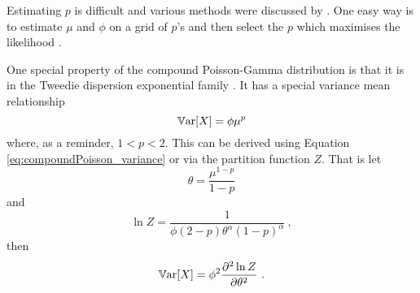 Estimating $p$ is difficult and various methods were discussed by \cite{zhang2013likelihood}. One easy way is to estimate $\mu$ and $\phi$ on a grid of $p$'s and then select the $p$ which maximises the likelihood \citep{dunn2005series}.

One special property of the compound Poisson-Gamma distribution is that it is in the Tweedie dispersion exponential family \citep{jorgensen1987exponential}. It has a special variance mean relationship
\begin{equation}
	\operatorname{\mathbb{V}ar}[X] = \phi \mu^p
\end{equation}
where, as a reminder, $1<p<2$. This can be derived using Equation \eqref{eq:compoundPoisson_variance} or via the partition function $Z$. That is let
\begin{equation}
	\theta = \frac{\mu^{1-p}}{1-p}
\end{equation}
and
\begin{equation}
	\ln Z = \frac{1}{\phi(2-p)\theta^\alpha(1-p)^\alpha} \ ,
\end{equation}
then
\begin{equation}
	\operatorname{\mathbb{V}ar}[X] = \phi^2 \frac{\partial^2\ln Z}{\partial\theta^2} \ .
\end{equation}